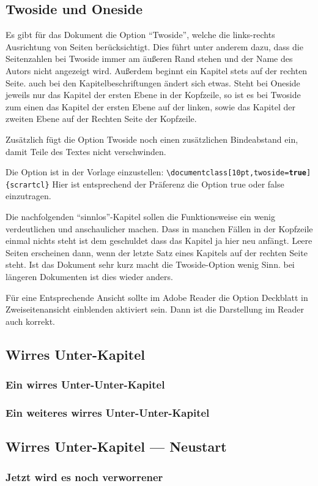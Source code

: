 \subsection{Twoside und Oneside}
\label{sec:twooneside}
Es gibt für das Dokument die Option "`Twoside"', welche die links-rechts Ausrichtung von Seiten berücksichtigt. Dies führt unter anderem dazu, dass die Seitenzahlen bei Twoside immer am äußeren Rand stehen und der Name des Autors nicht angezeigt wird. Außerdem beginnt ein Kapitel stets auf der rechten Seite. auch bei den Kapitelbeschriftungen ändert sich etwas. Steht bei Oneside jeweils nur das Kapitel der ersten Ebene in der Kopfzeile, so ist es bei Twoside zum einen das Kapitel der ersten Ebene auf der linken, sowie das Kapitel der zweiten Ebene auf der Rechten Seite der Kopfzeile.

Zusätzlich fügt die Option Twoside noch einen zusätzlichen Bindeabstand ein, damit Teile des Textes nicht verschwinden.

Die Option ist in der Vorlage einzustellen:
\texttt{\textbackslash documentclass[10pt,twoside=\textbf{true}]\{scrartcl\}}
Hier ist entsprechend der Präferenz die Option true oder false einzutragen.

Die nachfolgenden "`sinnlos"'-Kapitel sollen die Funktionsweise ein wenig verdeutlichen und anschaulicher machen. Dass in manchen Fällen in der Kopfzeile einmal nichts steht ist dem geschuldet dass das Kapitel ja hier neu anfängt. Leere Seiten erscheinen dann, wenn der letzte Satz eines Kapitels auf der rechten Seite steht. Ist das Dokument sehr kurz macht die Twoside-Option wenig Sinn. bei längeren Dokumenten ist dies wieder anders.

Für eine Entsprechende Ansicht sollte im Adobe Reader die Option Deckblatt in Zweiseitenansicht einblenden aktiviert sein. Dann ist die Darstellung im Reader auch korrekt.
 
\subsection{Wirres Unter-Kapitel}
\lipsum
\subsubsection{Ein wirres Unter-Unter-Kapitel}
\lipsum
\subsubsection{Ein weiteres wirres Unter-Unter-Kapitel}
\lipsum
\subsection{Wirres Unter-Kapitel --- Neustart}
\subsubsection{Jetzt wird es noch verworrener}
\lipsum
\cleardoublepage